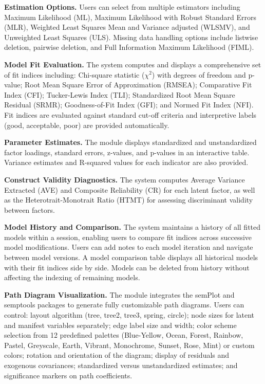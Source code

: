 \documentclass[12pt,a4paper]{article}
\begin{document}
\textbf{Estimation Options.} Users can select from multiple estimators including Maximum Likelihood (ML), Maximum Likelihood with Robust Standard Errors (MLR), Weighted Least Squares Mean and Variance adjusted (WLSMV), and Unweighted Least Squares (ULS). Missing data handling options include listwise deletion, pairwise deletion, and Full Information Maximum Likelihood (FIML).

\textbf{Model Fit Evaluation.} The system computes and displays a comprehensive set of fit indices including: Chi-square statistic ($\chi^2$) with degrees of freedom and p-value; Root Mean Square Error of Approximation (RMSEA); Comparative Fit Index (CFI); Tucker-Lewis Index (TLI); Standardized Root Mean Square Residual (SRMR); Goodness-of-Fit Index (GFI); and Normed Fit Index (NFI). Fit indices are evaluated against standard cut-off criteria and interpretive labels (good, acceptable, poor) are provided automatically.

\textbf{Parameter Estimates.} The module displays standardized and unstandardized factor loadings, standard errors, z-values, and p-values in an interactive table. Variance estimates and R-squared values for each indicator are also provided.

\textbf{Construct Validity Diagnostics.} The system computes Average Variance Extracted (AVE) and Composite Reliability (CR) for each latent factor, as well as the Heterotrait-Monotrait Ratio (HTMT) for assessing discriminant validity between factors.

\textbf{Model History and Comparison.} The system maintains a history of all fitted models within a session, enabling users to compare fit indices across successive model modifications. Users can add notes to each model iteration and navigate between model versions. A model comparison table displays all historical models with their fit indices side by side. Models can be deleted from history without affecting the indexing of remaining models.

\textbf{Path Diagram Visualization.} The module integrates the semPlot and semptools packages to generate fully customizable path diagrams. Users can control: layout algorithm (tree, tree2, tree3, spring, circle); node sizes for latent and manifest variables separately; edge label size and width; color scheme selection from 12 predefined palettes (Blue-Yellow, Ocean, Forest, Rainbow, Pastel, Greyscale, Earth, Vibrant, Monochrome, Sunset, Rose, Mint) or custom colors; rotation and orientation of the diagram; display of residuals and exogenous covariances; standardized versus unstandardized estimates; and significance markers on path coefficients.
\end{document}
